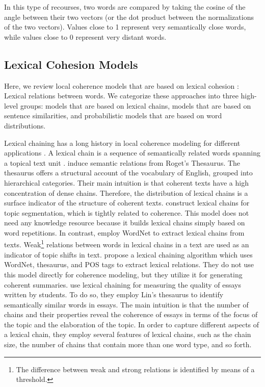 In this type of recourses, two words are compared by taking the cosine of the angle between their two vectors (or the dot product between the normalizations of the two vectors). 
Values close to 1 represent very semantically close words, while values close to 0 represent very distant words. 

\subsection{Lexical Cohesion Models}

Here, we review local coherence models that are based on lexical cohesion \cite{halliday76}: Lexical relations between words. 
We categorize these approaches into three high-level groups: models that are based on lexical chains,  models that are based on sentence similarities, and probabilistic models that are based on word distributions.  

Lexical chaining has a long history in local coherence modeling for different applications \cite{morris91,fenglijun09,wongbillytm12,benguosheng13,flor13}. 
A lexical chain is a sequence of semantically related words spanning a topical text unit \cite{morris91}. 
 induce semantic relations from Roget's Thesaurus. 
The thesaurus offers a structural account of the vocabulary of English, grouped into hierarchical categories. 
Their main intuition is that coherent texts have a high concentration of dense chains. 
Therefore, the distribution of lexical chains is a surface indicator of the structure of coherent texts. 
 construct lexical chains for topic segmentation, which is tightly related to coherence. 
This model does not need any knowledge resource because it builds lexical chains simply based on word repetitions. 
In contrast,  employ WordNet to extract lexical chains from texts.  
Weak\footnote{The difference between weak and strong relations is identified by means of a threshold.} relations between words in lexical chains in a text are used as an indicator of topic shifts in  text. 
 propose a lexical chaining algorithm which uses WordNet, thesaurus, and POS tags to extract lexical relations. 
They do not use this model directly for coherence modeling, but they utilize it for generating coherent summaries. 
 use lexical chaining for measuring the quality of essays written by students. 
To do so, they employ Lin’s thesaurus \cite{lindekang98} to identify semantically similar words in essays.   
The main intuition is that the number of chains and their properties reveal the coherence of essays in terms of the focus of the topic and the elaboration of the topic. 
In order to capture different aspects of a lexical chain, they employ several features of lexical chains, such as the chain size, the number of chains that contain more than one word type, and so forth. 


